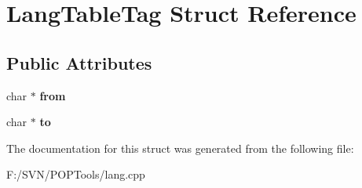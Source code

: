 \hypertarget{struct_lang_table_tag}{\section{Lang\-Table\-Tag Struct Reference}
\label{struct_lang_table_tag}
}
\subsection*{Public Attributes}
\begin{DoxyCompactItemize}
\item 
\hypertarget{struct_lang_table_tag_a9574808a28c23242ae2e4ebb13fa0d0d}{char $\ast$ {\bfseries from}}\label{struct_lang_table_tag_a9574808a28c23242ae2e4ebb13fa0d0d}

\item 
\hypertarget{struct_lang_table_tag_aeea601ddfa3849dba26ba51077b3f416}{char $\ast$ {\bfseries to}}\label{struct_lang_table_tag_aeea601ddfa3849dba26ba51077b3f416}

\end{DoxyCompactItemize}


The documentation for this struct was generated from the following file\-:\begin{DoxyCompactItemize}
\item 
F\-:/\-S\-V\-N/\-P\-O\-P\-Tools/lang.\-cpp\end{DoxyCompactItemize}
